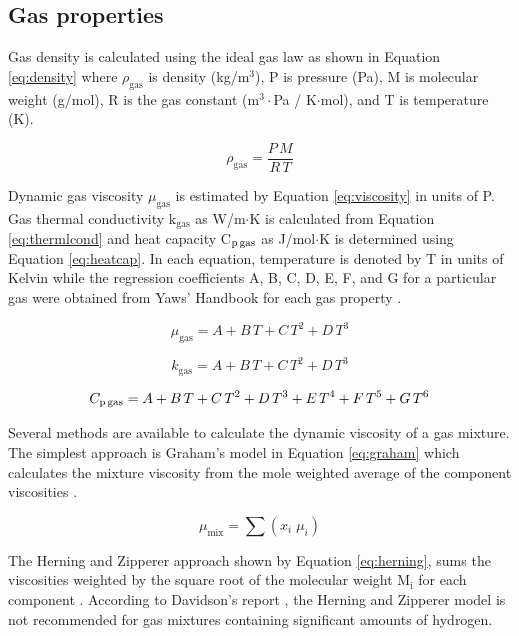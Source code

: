 \documentclass{article}
\begin{document}
\subsection{Gas properties}

Gas density is calculated using the ideal gas law as shown in Equation \ref{eq:density} where $\rho_\text{gas}$ is density (kg/m$^3$), P is pressure (Pa), M is molecular weight (g/mol), R is the gas constant (m$^3\cdot$Pa / K$\cdot$mol), and T is temperature (K).

\begin{equation}\label{eq:density}
    \rho_\text{gas} = \frac{P\,M}{R\,T}
\end{equation}

Dynamic gas viscosity $\mu_\text{gas}$ is estimated by Equation \ref{eq:viscosity} in units of \textmugreek P. Gas thermal conductivity k$_\text{gas}$ as W/m$\cdot$K is calculated from Equation \ref{eq:thermlcond} and heat capacity C$_\text{p\,gas}$ as J/mol$\cdot$K is determined using Equation \ref{eq:heatcap}. In each equation, temperature is denoted by T in units of Kelvin while the regression coefficients A, B, C, D, E, F, and G for a particular gas were obtained from Yaws' Handbook for each gas property \cite{Yaws2014}.

\begin{equation}\label{eq:viscosity}
    \mu_\text{gas} = A + B\,T + C\,T^2 + D\,T^3
\end{equation}

\begin{equation}\label{eq:thermlcond}
    k_\text{gas} = A + B\,T + C\,T^2 + D\,T^3
\end{equation}

\begin{equation}\label{eq:heatcap}
    C_\text{p\,gas} = A + B\,T + C\,T^2 + D\,T^3 + E\,T^4 + F\,T^5 + G\,T^6
\end{equation}

Several methods are available to calculate the dynamic viscosity of a gas mixture. The simplest approach is Graham's model in Equation \ref{eq:graham} which calculates the mixture viscosity from the mole weighted average of the component viscosities \cite{Graham-1846}.

\begin{equation}
    \mu_\text{mix} = \sum(x_i \; \mu_i)
    \label{eq:graham}
\end{equation}

\noindent The Herning and Zipperer approach shown by Equation \ref{eq:herning}, sums the viscosities weighted by the square root of the molecular weight M$_\text{i}$ for each component \cite{Herning-1936}. According to Davidson's report \cite{Davidson-1993}, the Herning and Zipperer model is not recommended for gas mixtures containing significant amounts of hydrogen.
\end{document}
